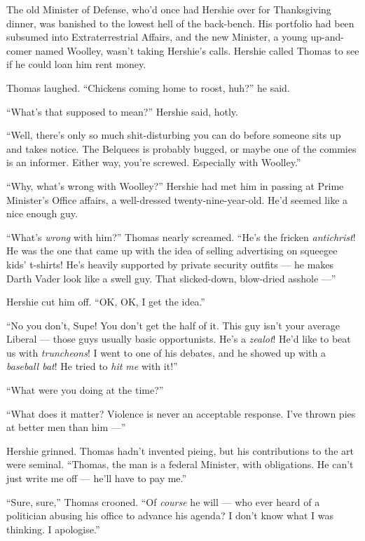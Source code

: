 The old Minister of Defense, who'd once had Hershie over for
Thanksgiving dinner, was banished to the lowest hell of the
back-bench. His portfolio had been subsumed into Extraterrestrial
Affairs, and the new Minister, a young up-and-comer named Woolley,
wasn't taking Hershie's calls. Hershie called Thomas to see if he
could loan him rent money.

Thomas laughed. ``Chickens coming home to roost, huh?'' he said.

``What's that supposed to mean?'' Hershie said, hotly.

``Well, there's only so much shit-disturbing you can do before someone sits up 
and takes notice. The Belquees is probably bugged, or maybe one of the commies 
is an informer. Either way, you're screwed. Especially with Woolley.''

``Why, what's wrong with Woolley?'' Hershie had met him in passing
at Prime Minister's Office affairs, a well-dressed
twenty-nine-year-old. He'd seemed like a nice enough guy.

``What's \emph{wrong} with him?'' Thomas nearly screamed.
``He's the fricken \emph{antichrist}! He was the one that came up with the idea 
of selling advertising on squeegee kids' t-shirts! He's heavily supported by 
private security outfits --- he makes Darth Vader look like a swell guy. That 
slicked-down, blow-dried asshole ---''

Hershie cut him off. ``OK, OK, I get the idea.''

``No you don't, Supe! You don't get the half of it. This guy isn't your average 
Liberal --- those guys usually basic opportunists. He's a \emph{zealot}! He'd 
like to beat us with \emph{truncheons}! I went to one of his debates, and he 
showed up with a \emph{baseball bat}! He tried to \emph{hit me} with it!''

``What were you doing at the time?''

``What does it matter? Violence is never an acceptable response. I've thrown 
pies at better men than him ---''

Hershie grinned. Thomas hadn't invented pieing, but his
contributions to the art were seminal.
``Thomas, the man is a federal Minister, with obligations. He can't just write 
me off --- he'll have to pay me.''

``Sure, sure,'' Thomas crooned.
``Of \emph{course} he will --- who ever heard of a politician abusing his 
office to advance his agenda? I don't know what I was thinking. I apologise.''

